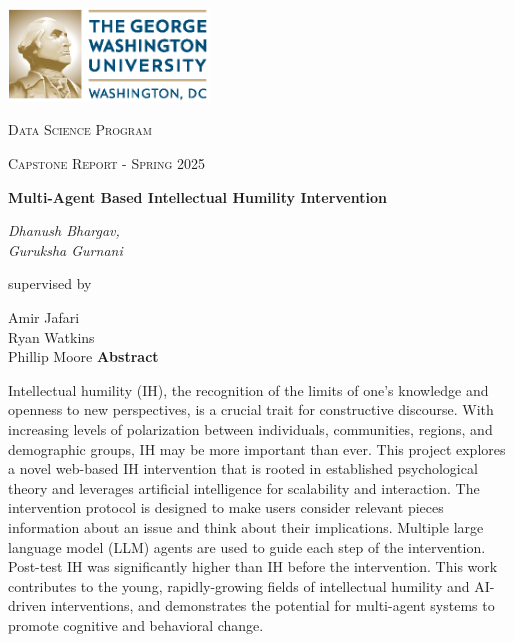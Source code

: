 \documentclass{scrartcl}
\renewenvironment{abstract}{
    \centering
    \textbf{Abstract}
    \vspace{0.5cm}
    \par\itshape
    \begin{minipage}{0.7\linewidth}}{\end{minipage}
    \noindent\ignorespaces
}
\begin{document}
\begin{titlepage}
	\centering
	\includegraphics[width=0.4\textwidth]{GW_logo.eps}\par
	\vspace{1.5cm}
	{\scshape\LARGE Data Science Program \par}
	\vspace{1cm}
	{\scshape\Large Capstone Report - Spring 2025\par}
	\vspace{1cm}
	{\huge\bfseries Multi-Agent Based Intellectual Humility Intervention\par}
	\vspace{1cm}
	{\Large\itshape Dhanush Bhargav, \\ Guruksha Gurnani\\}\par
	\vspace{1cm}
	supervised by\par
	Amir Jafari\\Ryan Watkins\\Phillip Moore
    \vspace{1cm}
    \vfill
	\begin{abstract}
	   Intellectual humility (IH), the recognition of the limits of one's knowledge and openness to new perspectives, is a crucial trait for constructive discourse. With increasing levels of polarization between individuals, communities, regions, and demographic groups, IH may be more important than ever. This project explores a novel web-based IH intervention that is rooted in established psychological theory and leverages artificial intelligence for scalability and interaction. The intervention protocol is designed to make users consider relevant pieces information about an issue and think about their implications. Multiple large language model (LLM) agents are used to guide each step of the intervention. Post-test IH was significantly higher than IH before the intervention. This work contributes to the young, rapidly-growing fields of intellectual humility and AI-driven interventions, and demonstrates the potential for multi-agent systems to promote cognitive and behavioral change.
	\end{abstract}
\end{titlepage}
\tableofcontents
\newpage
\end{document}
